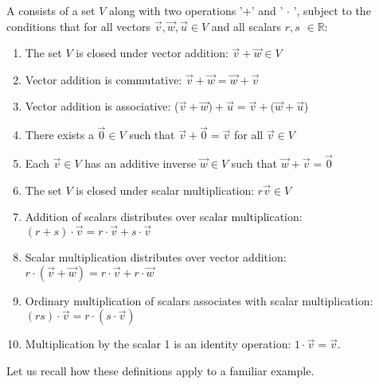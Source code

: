 \begin{defn}
A  consists of a set $V$ along with two operations '+' and  ' $\cdot$ ', subject to the conditions that for all vectors $ \vec {v},\vec{w},\vec{u} \in V$ and all scalars $r, s$ $\in \mathbb{R}$:
\begin{enumerate} [(1)]
\item
The set $V$ is closed under vector addition: \quad  $\vec{v} + \vec{w} \in V$
\item
Vector addition is commutative: \quad  $\vec{v} + \vec{w} = \vec{w} + \vec{v}$
\item
Vector addition is associative: \quad ($\vec{v} + \vec{w}) + \vec{u} = \vec{v} + (\vec{w} + \vec{u}$)
\item
There exists a  $\vec{0} \in V$ such that $\vec{v} + \vec{0} = \vec{v}$ for all $\vec{v} \in V$
\item
Each $\vec{v} \in V$ has an additive inverse $\vec{w} \in V$ such that $\vec{w} + \vec{v} = \vec{0}$
\item
The set $V$ is closed under scalar multiplication: \quad  $ r  \vec{v} \in V$
\item
Addition of scalars distributes over scalar multiplication: \quad $(r+ s) \cdot \vec{v} = r \cdot \vec{v} + s \cdot \vec{v}$
\item
Scalar multiplication distributes over vector addition: \quad $ r \cdot( \vec{v} + \vec{w}) = r \cdot \vec{v} + r \cdot \vec{w}$
\item
Ordinary multiplication of scalars associates with scalar multiplication: \quad $(rs) \cdot \vec{v} = r \cdot (s \cdot \vec{v})$
\item
Multiplication by the scalar 1 is an identity operation: $1 \cdot \vec{v} = \vec{v}$.
\end{enumerate}

\end{defn}
Let us recall how these definitions apply to a familiar example.

